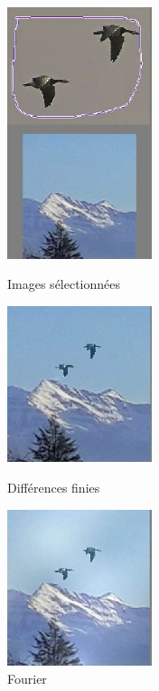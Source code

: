 \begin{figure}[!htb]
   \begin{minipage}{0.33\textwidth}
     \centering
     \includegraphics[width = 120pt]{Images/Resultats/OiseauMont.png}
     \caption{Images sélectionnées}
      \end{minipage}\hfill
   \begin{minipage}{0.33\textwidth}
     \centering
     \includegraphics[width = 120pt]{Images/Resultats/oiseauRenduDF.png}
     \caption{Différences finies}
      \end{minipage}\hfill
   \begin{minipage}{0.33\textwidth}
     \centering
     \includegraphics[width= 120pt]{Images/Resultats/OiseauRenduFourier.png}
     \caption{Fourier}
   \end{minipage}
\end{figure}

